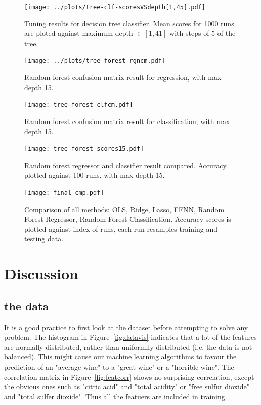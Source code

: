 \documentclass[english,notitlepage,reprint,nofootinbib]{revtex4-1}
\begin{document}
\begin{figure}[H]
	\centering
	\texttt{[image: ../plots/tree-clf-scoresVSdepth[1,45].pdf]}
	\caption{Tuning results for decision tree classifier. Mean scores for 1000 runs are ploted against maximum depth $ \in [1,41] $ with steps of $ 5 $  of the tree.}
	\label{fig:tree-clf-tune}
\end{figure}

\begin{figure}[H]
	\centering
	\texttt{[image: ../plots/tree-forest-rgncm.pdf]}
	\caption{Random forest confusion matrix result for regression, with max depth 15.}
	\label{fig:forest-rgncm}
\end{figure}

\begin{figure}[H]
	\centering
	\texttt{[image: tree-forest-clfcm.pdf]}
	\caption{Random forest confusion matrix result for classification, with max depth 15.}
	\label{fig:forest-clfcm}
\end{figure}

\begin{figure}[H]
	\centering
	\texttt{[image: tree-forest-scores15.pdf]}
	\caption{Random forest regressor and classifier result compared. Accuracy plotted against 100 runs, with max depth 15. }
	\label{fig:forest-compared}
\end{figure}

\begin{figure}[H]
	\centering
	\texttt{[image: final-cmp.pdf]}
	\caption{Comparison of all methods: OLS, Ridge, Lasso, FFNN, Random Forest Regressor, Random Forest Classification. Accuracy scores is plotted against index of runs, each run resamples training and testing data.}
	\label{fig:final-cmp}
\end{figure}


\section{Discussion}\label{sec:discussion}
%

\subsection{the data}
It is a good practice to first look at the dataset before attempting to solve any problem. The histogram in Figure~\ref{fig:datavis} indicates that a lot of the features are normally distributed, rather than uniformlly distributed (i.e. the data is not balanced). This might cause our machine learning algorithms to favour the prediction of an "average wine" to a "great wine" or a "horrible wine". The correlation matrix in Figure~\ref{fig:featcorr} shows no surprising correlation, except the obvious ones such as "citric acid" and "total acidity" or "free sulfur dioxide" and "total sulfer dioxide". Thus all the featuers are included in training.
\end{document}
